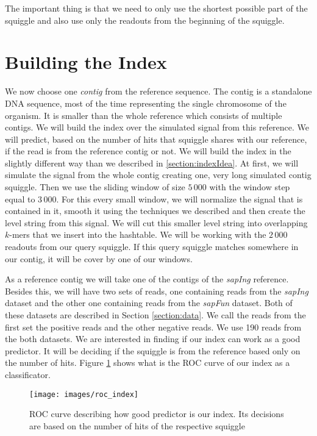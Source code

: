 The important thing is that we need to only use the shortest possible part of the squiggle
and also use only the readouts from the beginning of the squiggle.

\section{Building the Index}

We now choose one \textit{contig} from the reference sequence. The contig is a
standalone DNA sequence, most of the time representing the single chromosome
of the organism. It is smaller than the whole reference which consists of multiple contigs.
We will build the index over the simulated signal from this reference. We will predict,
based on the number of hits that squiggle shares with our reference, if the read is from the reference contig
or not. We will build the index in the slightly different way than we described in \ref{section:indexIdea}.
At first, we will simulate the signal from the whole contig creating one, very long simulated contig squiggle.
Then we use the sliding window of size $5\,000$ with the window step equal to $3\,000$.
For this every small window, we will normalize the signal that is contained in it, smooth
it using the techniques we described and then create the level string from this signal.
We will cut this smaller level string into overlapping $k$-mers that we insert into the
hashtable. We will be working with the $2\,000$ readouts from our query squiggle. If this
query squiggle matches somewhere in our contig, it will be cover by one of our windows.

As a reference contig we will take one of the contigs of the \textit{sapIng} reference.
Besides this, we will have two sets of reads, one containing reads from the \textit{sapIng}
dataset and the other one containing reads from the \textit{sapFun} dataset. Both of these datasets
are described in Section \ref{section:data}. We call the reads from the first set the
positive reads and the other negative reads. We use 190 reads from the both datasets.
We are interested in finding if our index can work as a good predictor. It will be
deciding if the squiggle is from the reference based only on the number of hits.
Figure \ref{obr:roc_index} shows what is the ROC curve of our index as a classificator.

\begin{figure}
\centerline{\texttt{[image: images/roc\_index]}}
\caption[TODO]{ROC curve describing how good predictor is our index. Its decisions
are based on the number of hits of the respective squiggle}
\label{obr:roc_index}
\end{figure}

